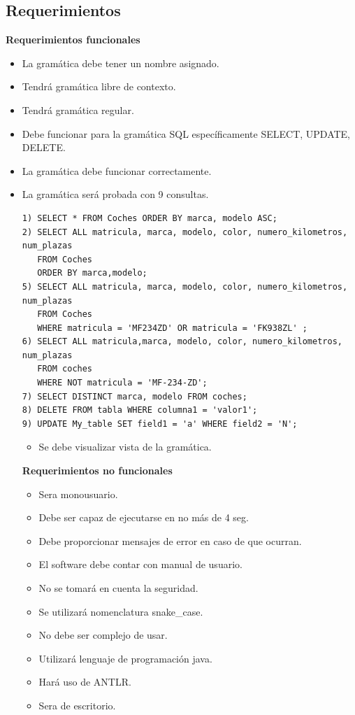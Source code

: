 \documentclass[a4paper,openright,14pt]{report}
\begin{document}
\subsection{Requerimientos}
\begin{flushleft}
\textbf{Requerimientos funcionales}
\end{flushleft}
\begin{itemize}
\item La gram\'atica debe tener un nombre asignado.
\item Tendr\'a gram\'atica libre de contexto.
\item Tendr\'a gram\'atica regular.
\item Debe funcionar para la gram\'atica SQL espec\'ificamente SELECT, UPDATE, DELETE.
\item La gram\'atica debe funcionar correctamente.
\item La gram\'atica ser\'a probada con 9 consultas.
\begin{lstlisting}
1) SELECT * FROM Coches ORDER BY marca, modelo ASC;
2) SELECT ALL matricula, marca, modelo, color, numero_kilometros, num_plazas 
   FROM Coches
   ORDER BY marca,modelo;
5) SELECT ALL matricula, marca, modelo, color, numero_kilometros, num_plazas
   FROM Coches
   WHERE matricula = 'MF234ZD' OR matricula = 'FK938ZL' ;
6) SELECT ALL matricula,marca, modelo, color, numero_kilometros, num_plazas
   FROM coches 
   WHERE NOT matricula = 'MF-234-ZD';
7) SELECT DISTINCT marca, modelo FROM coches;
8) DELETE FROM tabla WHERE columna1 = 'valor1';
9) UPDATE My_table SET field1 = 'a' WHERE field2 = 'N';
\end{lstlisting}
\begin{itemize}
\item Se debe visualizar vista de la gram\'atica.
\end{itemize}
\textbf{Requerimientos no funcionales}
\begin{itemize}
\item Sera monousuario.
\item Debe ser capaz de ejecutarse en no m\'as de 4 seg.
\item Debe proporcionar mensajes de error en caso de que ocurran.
\item El software debe contar con manual de usuario.
\item No se tomar\'a en cuenta la seguridad.
\item Se utilizar\'a nomenclatura snake\_case.
\item No debe ser complejo de usar.
\item Utilizar\'a lenguaje de programaci\'on java.
\item Har\'a uso de ANTLR.
\item Sera de escritorio.
\end{itemize}	
\end{itemize}
\end{document}
